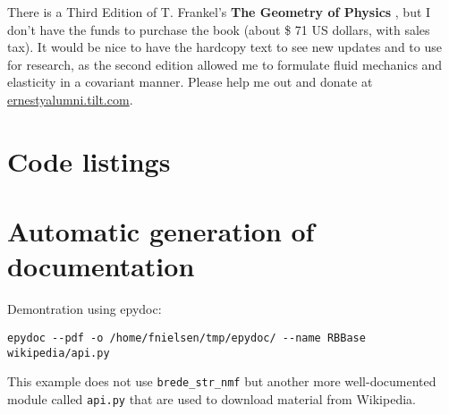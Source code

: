 \documentclass[10pt]{amsart}
\begin{document}
There is a Third Edition of T. Frankel's \textbf{The Geometry of Physics} \cite{TFrankel2004}, but I don't have the funds to purchase the book (about \$ 71 US dollars, with sales tax). It would be nice to have the hardcopy text to see new updates and to use for research, as the second edition allowed me to formulate fluid mechanics and elasticity in a covariant manner.  Please help me out and donate at \url{ernestyalumni.tilt.com}.  




\clearpage
\onecolumn

\section{Code listings}

\lstlistoflistings




\newpage
\section{Automatic generation of documentation}

Demontration using epydoc:
\begin{verbatim}
epydoc --pdf -o /home/fnielsen/tmp/epydoc/ --name RBBase wikipedia/api.py
\end{verbatim}
This example does not use \verb!brede_str_nmf! but another more
well-documented module called {\tt api.py} that are used to download
material from Wikipedia. 

%
\end{document}
